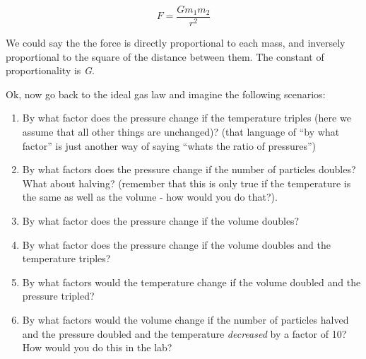 \documentclass[11pt]{article}
\providecommand{\tightlist}{%
      \setlength{\itemsep}{0pt}\setlength{\parskip}{0pt}}
\begin{document}
\[ F = \frac{G m_1 m_2}{r^2} \]

We could say the the force is directly proportional to each mass, and
inversely proportional to the square of the distance between them. The
constant of proportionality is \emph{G}.

Ok, now go back to the ideal gas law and imagine the following
scenarios:

\begin{enumerate}
\def\labelenumi{\arabic{enumi}.}
\tightlist
\item
  By what factor does the pressure change if the temperature triples
  (here we assume that all other things are unchanged)? (that language
  of ``by what factor'' is just another way of saying ``whats the ratio
  of pressures'')
\item
  By what factors does the pressure change if the number of particles
  doubles? What about halving? (remember that this is only true if the
  temperature is the same as well as the volume - how would you do
  that?).
\item
  By what factor does the pressure change if the volume doubles?
\item
  By what factor does the pressure change if the volume doubles and the
  temperature triples?
\item
  By what factors would the temperature change if the volume doubled and
  the pressure tripled?
\item
  By what factors would the volume change if the number of particles
  halved and the pressure doubled and the temperature \emph{decreased}
  by a factor of 10? How would you do this in the lab?
\end{enumerate}


    
    
    
\end{document}
